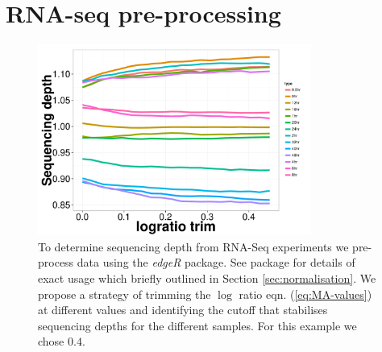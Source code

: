 \chapter{RNA-seq pre-processing}
\label{cha:mcf10a-results}
\label{sec:sequencing-depth-rna}

\begin{figure}[!h]
  \centering
  \includegraphics[width=0.8\textwidth]{pics/sequencing-depth.pdf}
  \caption{To determine sequencing depth from RNA-Seq experiments we pre-process data using the \emph{edgeR} package. See package \cite{Robinson:2010cw} for details of exact usage which briefly outlined in Section \ref{sec:normalisation}. We propose a strategy of trimming the $\log$ ratio eqn. (\ref{eq:MA-values}) at different values and identifying the cutoff that stabilises sequencing depths for the different samples. For this example we chose $0.4$.}
  \label{fig:seq-depth}
\end{figure}

